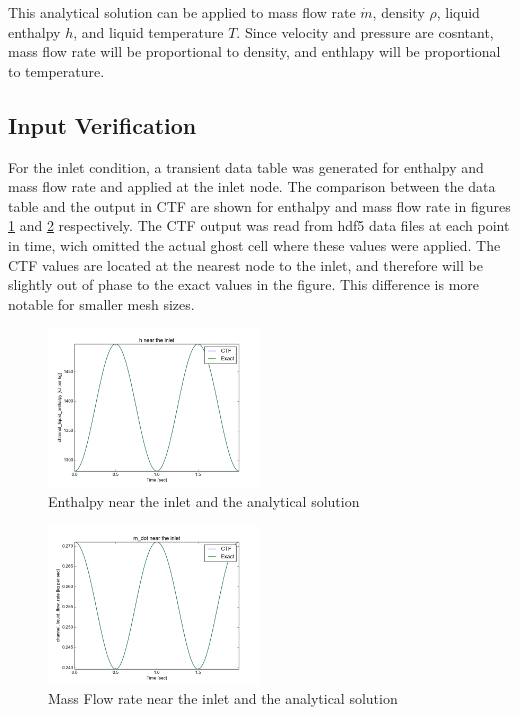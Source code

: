 \documentclass{mc2015}
\begin{document}
This analytical solution can be applied to mass flow rate $\dot{m}$,
density $\rho$, liquid enthalpy $h$, and liquid temperature $T$. Since velocity
and pressure are cosntant, mass flow rate will be proportional to density, and
enthlapy will be proportional to temperature.

\subsection{Input Verification}

For the inlet condition, a transient data table was generated for enthalpy and
mass flow rate and applied at the inlet node. The comparison between the data
table and the output in CTF are shown for enthalpy and mass flow rate in figures
\ref{fig:Inlet_h} and \ref{fig:Inlet_m_dot} respectively. The CTF output was
read from hdf5 data files at each point in time, wich omitted the actual ghost
cell where these values were applied. The CTF values are located at the nearest
node to the inlet, and therefore will be slightly out of phase to the exact
values in the figure. This difference is more notable for smaller mesh sizes.

\begin{figure}[!h]
	\centering
	\includegraphics[width=0.500\textwidth]{images/Code_Verification/run_00_00/residual/results/Inlet_h}
	\caption{Enthalpy near the inlet and the analytical solution}
	\label{fig:Inlet_h}
\end{figure}

\begin{figure}[!h]
	\centering
	\includegraphics[width=0.500\textwidth]{images/Code_Verification/run_00_00/residual/results/Inlet_m_dot}
	\caption{Mass Flow rate near the inlet and the analytical solution}
	\label{fig:Inlet_m_dot}
\end{figure}
\end{document}
